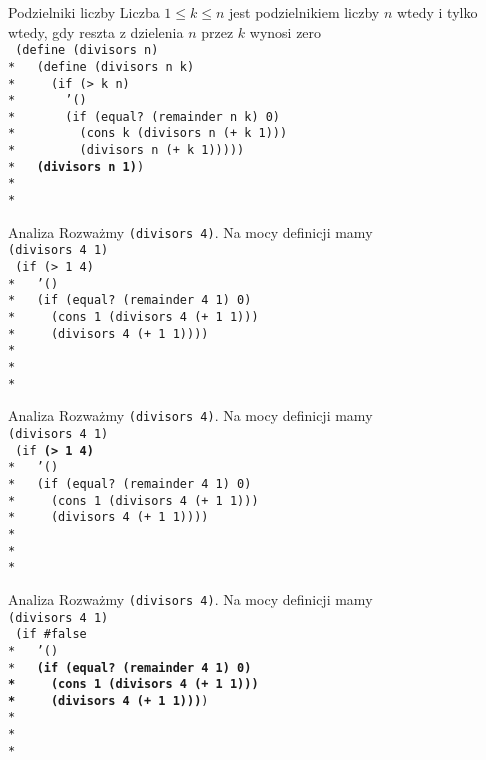 \begin{frame}{Podzielniki liczby}
  Liczba $1 \le k \le n$ jest podzielnikiem liczby $n$ wtedy i tylko wtedy,
  gdy reszta z dzielenia $n$ przez $k$ wynosi zero\\
  \texttt{
(define (divisors n)\\*
\ \ (define (divisors n k)\\*
\ \ \ \ (if (> k n)\\*
\ \ \ \ \ \ '()\\*
\ \ \ \ \ \ (if (equal?\ (remainder n k) 0)\\*
\ \ \ \ \ \ \ \ (cons k (divisors n (+ k 1)))\\*
\ \ \ \ \ \ \ \ (divisors n (+ k 1)))))\\*
\ \ \textbf{(divisors n 1)})
\ \\*
\ \\*
  }
\end{frame}

\begin{frame}{Analiza}
  Rozważmy \texttt{(divisors 4)}. Na mocy definicji mamy\pause\\
  \texttt{(divisors 4 1)}\pause\\
  \texttt{
(if (> 1 4)\\*
\ \ '()\\*
\ \ (if (equal?\ (remainder 4 1) 0)\\*
\ \ \ \ (cons 1 (divisors 4 (+ 1 1)))\\*
\ \ \ \ (divisors 4 (+ 1 1))))\\*
\ \\*
\ \\*
}
\end{frame}


\begin{frame}{Analiza}
  Rozważmy \texttt{(divisors 4)}. Na mocy definicji mamy\\
  \texttt{(divisors 4 1)}\\
  \texttt{
(if \textbf{(> 1 4)}\\*
\ \ '()\\*
\ \ (if (equal?\ (remainder 4 1) 0)\\*
\ \ \ \ (cons 1 (divisors 4 (+ 1 1)))\\*
\ \ \ \ (divisors 4 (+ 1 1))))\\*
\ \\*
\ \\*
}
\end{frame}

\begin{frame}{Analiza}
  Rozważmy \texttt{(divisors 4)}. Na mocy definicji mamy\\
  \texttt{(divisors 4 1)}\\
  \texttt{
(if \#false\\*
\ \ '()\\*
\ \ \textbf{(if (equal?\ (remainder 4 1) 0)\\*
\ \ \ \ (cons 1 (divisors 4 (+ 1 1)))\\*
\ \ \ \ (divisors 4 (+ 1 1)))})\\*
\ \\*
\ \\*
}
\end{frame}

